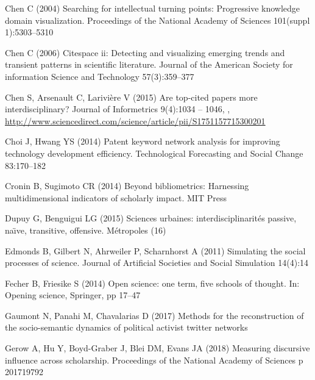 \documentclass[10pt]{article}
\begin{document}
\begin{thebibliography}{84}
Chen C (2004) Searching for intellectual turning points: Progressive knowledge
  domain visualization. Proceedings of the National Academy of Sciences
  101(suppl 1):5303--5310

Chen C (2006) Citespace ii: Detecting and visualizing emerging trends and
  transient patterns in scientific literature. Journal of the American Society
  for information Science and Technology 57(3):359--377

Chen S, Arsenault C, Larivière V (2015) Are top-cited papers more
  interdisciplinary? Journal of Informetrics 9(4):1034 -- 1046,
  ,
  \urlprefix\url{http://www.sciencedirect.com/science/article/pii/S1751157715300201}

Choi J, Hwang YS (2014) Patent keyword network analysis for improving
  technology development efficiency. Technological Forecasting and Social
  Change 83:170--182

Cronin B, Sugimoto CR (2014) Beyond bibliometrics: Harnessing multidimensional
  indicators of scholarly impact. MIT Press

Dupuy G, Benguigui LG (2015) Sciences urbaines: interdisciplinarit{\'e}s
  passive, na{\"\i}ve, transitive, offensive. M{\'e}tropoles (16)

Edmonds B, Gilbert N, Ahrweiler P, Scharnhorst A (2011) Simulating the social
  processes of science. Journal of Artificial Societies and Social Simulation
  14(4):14

Fecher B, Friesike S (2014) Open science: one term, five schools of thought.
  In: Opening science, Springer, pp 17--47

Gaumont N, Panahi M, Chavalarias D (2017) Methods for the reconstruction of the
  socio-semantic dynamics of political activist twitter networks

Gerow A, Hu Y, Boyd-Graber J, Blei DM, Evans JA (2018) Measuring discursive
  influence across scholarship. Proceedings of the National Academy of Sciences
  p 201719792


\end{thebibliography}
\end{document}
